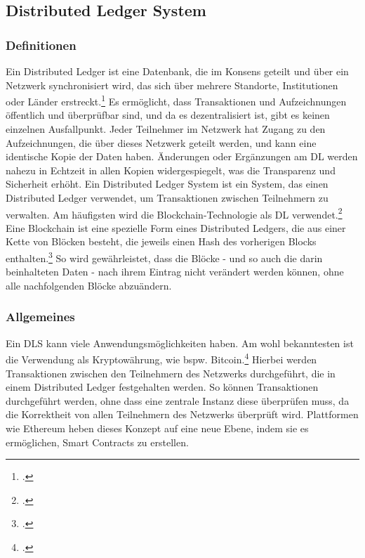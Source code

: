 \noindent

\subsection{Distributed Ledger System}
\label{sec:definition-dls}

\subsubsection{Definitionen}
Ein Distributed Ledger ist eine Datenbank, die im Konsens geteilt und über ein Netzwerk synchronisiert wird, das sich über mehrere Standorte, Institutionen oder Länder erstreckt.\footcite[Vgl. hierzu und im Folgenden][]{w1,w2} Es ermöglicht, dass Transaktionen und Aufzeichnungen öffentlich und überprüfbar sind, und da es dezentralisiert ist, gibt es keinen einzelnen Ausfallpunkt. Jeder Teilnehmer im Netzwerk hat Zugang zu den Aufzeichnungen, die über dieses Netzwerk geteilt werden, und kann eine identische Kopie der Daten haben. Änderungen oder Ergänzungen am DL werden nahezu in Echtzeit in allen Kopien widergespiegelt, was die Transparenz und Sicherheit erhöht.
\bigbreak
\noindent
Ein Distributed Ledger System ist ein System, das einen Distributed Ledger verwendet, um Transaktionen zwischen Teilnehmern zu verwalten. Am häufigsten wird die Blockchain-Technologie als DL verwendet.\footcite[Vgl.][]{w3}
\bigbreak
\noindent
Eine Blockchain ist eine spezielle Form eines Distributed Ledgers, die aus einer Kette von Blöcken besteht, die jeweils einen Hash des vorherigen Blocks enthalten.\footcite[Vgl. hierzu und im Folgenden][16]{q3} So wird gewährleistet, dass die Blöcke - und so auch die darin beinhalteten Daten - nach ihrem Eintrag nicht verändert werden können, ohne alle nachfolgenden Blöcke abzuändern.

\subsubsection{Allgemeines}
Ein DLS kann viele Anwendungsmöglichkeiten haben. Am wohl bekanntesten ist die Verwendung als Kryptowährung, wie bspw. Bitcoin.\footcite[Vgl. hierzu und im Folgenden][1]{q4} Hierbei werden Transaktionen zwischen den Teilnehmern des Netzwerks durchgeführt, die in einem Distributed Ledger festgehalten werden. So können Transaktionen durchgeführt werden, ohne dass eine zentrale Instanz diese überprüfen muss, da die Korrektheit von allen Teilnehmern des Netzwerks überprüft wird.
\bigbreak
\noindent
Plattformen wie Ethereum heben dieses Konzept auf eine neue Ebene, indem sie es ermöglichen, Smart Contracts zu erstellen.

